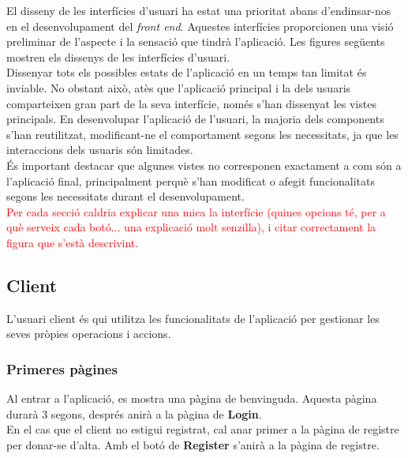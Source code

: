 \documentclass[a4paper,12pt,twoside]{ThesisStyle}
\newcommand{\pau}[1]{\textcolor{red}{#1}}
\begin{document}
El disseny de les interfícies d'usuari ha estat una prioritat abans d'endinsar-nos en el desenvolupament del \textit{front end}. Aquestes interfícies proporcionen una visió preliminar de l'aspecte i la sensació que tindrà l'aplicació. Les figures següents mostren els dissenys de les interfícies d'usuari. \\

Dissenyar tots els possibles estats de l'aplicació en un temps tan limitat és inviable. No obstant això, atès que l'aplicació principal i la dels usuaris comparteixen gran part de la seva interfície, només s'han dissenyat les vistes principals. En desenvolupar l'aplicació de l'usuari, la majoria dels components s'han reutilitzat, modificant-ne el comportament segons les necessitats, ja que les interaccions dels usuaris són limitades.\\

És important destacar que algunes vistes no corresponen exactament a com són a l'aplicació final, principalment perquè s'han modificat o afegit funcionalitats segons les necessitats durant el desenvolupament.\\

\pau{Per cada secció caldria explicar una mica la interfície (quines opcions té, per a què serveix cada botó... una explicació molt senzilla), i citar correctament la figura que s'està descrivint.}


\subsection{Client}
\label{subsec: Client}

L'usuari client és qui utilitza les funcionalitats de l'aplicació per gestionar les seves pròpies operacions i accions.

\subsubsection{Primeres pàgines}
\label{subsubsec: Primeres pàgines}

Al entrar a l'aplicació, es mostra una pàgina de benvinguda. Aquesta pàgina durarà 3 segons, després anirà a la pàgina de \textbf{Login}.\\

En el cas que el client no estigui registrat, cal anar primer a la pàgina de registre per donar-se d'alta. Amb el botó de \textbf{Register} s'anirà a la pàgina de registre.
\end{document}
